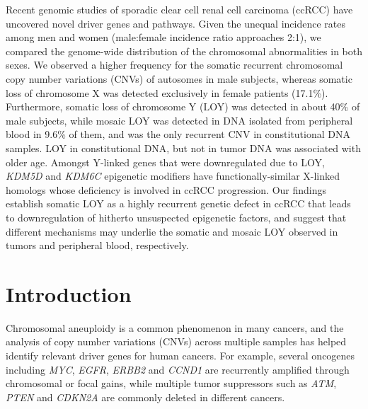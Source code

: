 Recent genomic studies of sporadic clear cell renal cell carcinoma (ccRCC) have uncovered novel driver genes and pathways.
Given the unequal incidence rates among men and women (male:female incidence ratio approaches 2:1), we compared the genome-wide distribution of the chromosomal abnormalities in both sexes.
We observed a higher frequency for the somatic recurrent chromosomal copy number variations (CNVs) of autosomes in male subjects, whereas somatic loss of chromosome X was detected exclusively in female patients (17.1\%).
Furthermore, somatic loss of chromosome Y (LOY) was detected in about 40\% of male subjects, while mosaic LOY was detected in DNA isolated from peripheral blood in 9.6\% of them, and was the only recurrent CNV in constitutional DNA samples.
LOY in constitutional DNA, but not in tumor DNA was associated with older age.
Amongst Y-linked genes that were downregulated due to LOY, {\it KDM5D} and {\it KDM6C} epigenetic modifiers have functionally-similar X-linked homologs whose deficiency is involved in ccRCC progression.
Our findings establish somatic LOY as a highly recurrent genetic defect in ccRCC that leads to downregulation of hitherto unsuspected epigenetic factors, and suggest that different mechanisms may underlie the somatic and mosaic LOY observed in tumors and peripheral blood, respectively. 

\section{Introduction}

Chromosomal aneuploidy is a common phenomenon in many cancers, and the analysis of copy number variations (CNVs) across multiple samples has helped identify relevant driver genes for human cancers.
For example, several oncogenes including {\it MYC}, {\it EGFR}, {\it ERBB2} and {\it CCND1} are recurrently amplified through chromosomal or focal gains, while multiple tumor suppressors such as {\it ATM}, {\it PTEN} and {\it CDKN2A} are commonly deleted in different cancers\cite{Zack2013}.

